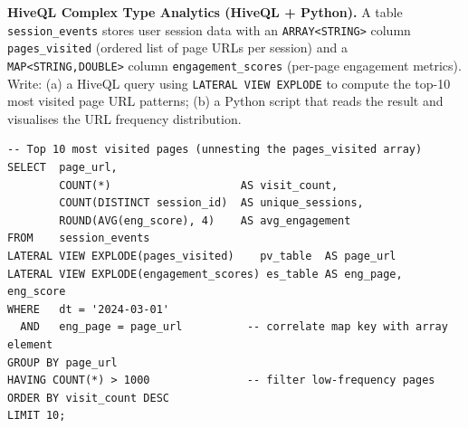 \pe \textbf{HiveQL Complex Type Analytics (HiveQL + Python).}
A table \texttt{session\_events} stores user session data with an
\texttt{ARRAY<STRING>} column \texttt{pages\_visited} (ordered list
of page URLs per session) and a \texttt{MAP<STRING,DOUBLE>} column
\texttt{engagement\_scores} (per-page engagement metrics). Write:
(a) a HiveQL query using \texttt{LATERAL VIEW EXPLODE} to compute
the top-10 most visited page URL patterns; (b) a Python script that
reads the result and visualises the URL frequency distribution.

\begin{lstlisting}[style=hiveql, caption={PE7.3a: LATERAL VIEW EXPLODE on session pages}]
-- Top 10 most visited pages (unnesting the pages_visited array)
SELECT  page_url,
        COUNT(*)                    AS visit_count,
        COUNT(DISTINCT session_id)  AS unique_sessions,
        ROUND(AVG(eng_score), 4)    AS avg_engagement
FROM    session_events
LATERAL VIEW EXPLODE(pages_visited)    pv_table  AS page_url
LATERAL VIEW EXPLODE(engagement_scores) es_table AS eng_page, eng_score
WHERE   dt = '2024-03-01'
  AND   eng_page = page_url          -- correlate map key with array element
GROUP BY page_url
HAVING COUNT(*) > 1000               -- filter low-frequency pages
ORDER BY visit_count DESC
LIMIT 10;
\end{lstlisting}

